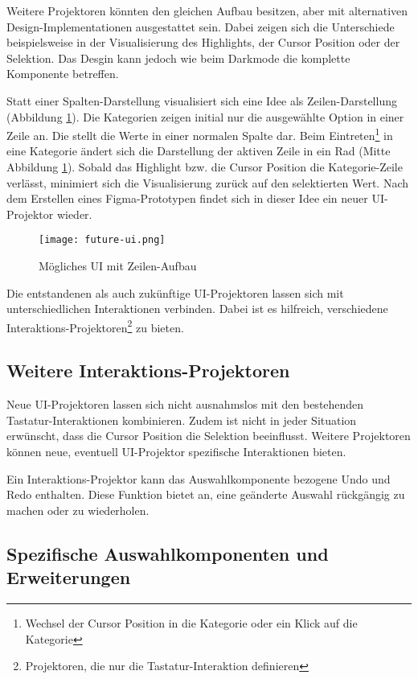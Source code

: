Weitere Projektoren könnten den gleichen Aufbau besitzen, aber mit alternativen Design-Implementationen ausgestattet sein. 
Dabei zeigen sich die Unterschiede beispielsweise in der Visualisierung des Highlights, der Cursor Position oder der Selektion. 
Das Desgin kann jedoch wie beim Darkmode die komplette Komponente betreffen. 

Statt einer Spalten-Darstellung visualisiert sich eine Idee als Zeilen-Darstellung (Abbildung \ref{img:futureUi}). 
Die Kategorien zeigen initial nur die ausgewählte Option in einer Zeile an. 
Die  stellt die Werte in einer normalen Spalte dar. 
Beim Eintreten\footnote{
    Wechsel der Cursor Position in die Kategorie oder ein Klick auf die Kategorie
} in eine Kategorie ändert sich die Darstellung der aktiven Zeile in ein Rad (Mitte Abbildung \ref{img:futureUi}). 
Sobald das Highlight bzw. die Cursor Position die Kategorie-Zeile verlässt, minimiert sich die Visualisierung zurück auf den selektierten Wert. 
Nach dem Erstellen eines Figma-Prototypen findet sich in dieser Idee ein neuer UI-Projektor wieder. 

\begin{figure}[!htb]
    \centering
    \texttt{[image: future-ui.png]}
    \caption{Mögliches UI mit Zeilen-Aufbau}
    \label{img:futureUi}
\end{figure}

Die entstandenen als auch zukünftige UI-Projektoren lassen sich mit unterschiedlichen Interaktionen verbinden. 
Dabei ist es hilfreich, verschiedene Interaktions-Projektoren\footnote{
    Projektoren, die nur die Tastatur-Interaktion definieren
} zu bieten. 


\subsection{Weitere Interaktions-Projektoren}
\label{sec:moreInteraction}

Neue UI-Projektoren lassen sich nicht ausnahmslos mit den bestehenden Tastatur-Inter\-aktionen kombinieren. 
Zudem ist nicht in jeder Situation erwünscht, dass die Cursor Position die Selektion beeinflusst. 
Weitere Projektoren können neue, eventuell UI-Projektor spezifische Interaktionen bieten. 

Ein Interaktions-Projektor kann das Auswahlkomponente bezogene Undo und Redo enthalten. 
Diese Funktion bietet an, eine geänderte Auswahl rückgängig zu machen oder zu wiederholen. 


\subsection{Spezifische Auswahlkomponenten und Erweiterungen}
\label{sec:specificComponents}

